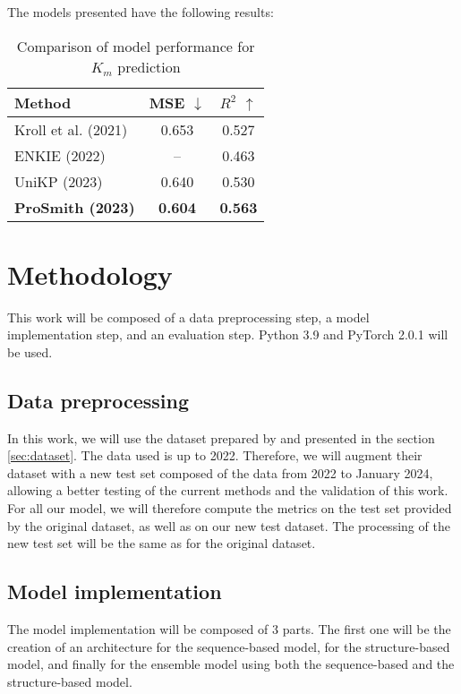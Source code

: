 The models presented have the following results:

\begin{table}[ht]
  \centering
  \begin{tabular}{lcc}
    \hline
    \textbf{Method} & \textbf{MSE \(\downarrow\)} & \textbf{\(R^2\) \(\uparrow\)} \\
    \hline
    Kroll et al. (2021) & 0.653 & 0.527 \\
    ENKIE (2022) & -- & 0.463 \\
    UniKP (2023) & 0.640 & 0.530 \\
    \textbf{ProSmith (2023)} & \textbf{0.604} & \textbf{0.563} \\
    \hline
  \end{tabular}
  \caption{Comparison of model performance for $K_m$ prediction}
  \label{tab:model_performance}
\end{table}


\section{Methodology}
This work will be composed of a data preprocessing step, a model implementation step, and an
evaluation step. Python 3.9 and PyTorch 2.0.1 will be used.

\subsection{Data preprocessing}
In this work, we will use the dataset prepared by \citeauthor{km1} and presented in the section \ref{sec:dataset}. The data used is up to 2022. Therefore, we will augment their dataset with a new test set composed of the data from 2022 to January 2024, allowing a better testing of the current methods and the validation of this work. For all our model, we will therefore compute the metrics on the test set provided by the original dataset, as well as on our new test dataset. The processing of the new test set will be the same as for the original dataset.

\subsection{Model implementation}
The model implementation will be composed of 3 parts. The first one will be the creation of an architecture for the sequence-based model, for the structure-based model, and finally for the ensemble model using both the sequence-based and the structure-based model.

